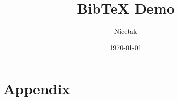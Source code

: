 \documentclass[a4paper,12pt]{article}
\begin{document}
\title{BibTeX Demo}
\author{Nicetak}
\date{\today}
\maketitle






\newpage



\newpage
\part*{Appendix}

\end{document}
